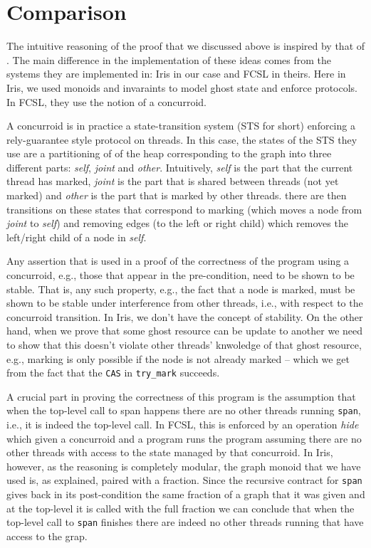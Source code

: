 \documentclass[]{scrartcl}
\def\MyMLe{\lstinline[language=MyML, basicstyle=\small\ttfamily, mathescape=true]}
\begin{document}
\section{Comparison}
The intuitive reasoning of the proof that we discussed above is inspired by that of \cite{Sergey:2015:MVF:2737924.2737964}.
The main difference in the implementation of these ideas comes from the
systems they are implemented in: Iris in our case and FCSL in theirs.
Here in Iris, we used monoids and invaraints to model ghost state and
enforce protocols.
In FCSL, they use the notion of a concurroid.

A concurroid is in practice a state-transition system (STS for short)
enforcing a rely-guarantee style protocol on threads.
In this case, the states of the STS they use are a partitioning of of the
heap corresponding to the graph into three different parts:
\textit{self}, \textit{joint} and \textit{other}.
Intuitively, \textit{self} is the part that the current thread has marked,
\textit{joint} is the part that is shared between threads (not yet marked)
and \textit{other} is the part that is marked by other threads.
there are then transitions on these states that correspond to marking
(which moves a node from \textit{joint} to \textit{self}) and removing
edges (to the left or right child) which removes the left/right child of a
node in \textit{self}.

Any assertion that is used in a proof of the correctness of the program
using a concurroid, e.g., those that appear in the pre-condition,
need to be shown to be stable.
That is, any such property, e.g., the fact that a node is marked, must be
shown to be stable under interference from other threads, i.e., with
respect to the concurroid transition.
In Iris, we don't have the concept of stability.
On the other hand, when we prove that some ghost resource can be
update to another we need to show that this doesn't violate other
threads' knwoledge of that ghost resource, e.g., marking is only possible
if the node is not already marked -- which we get from the fact that the \MyMLe|CAS| in \MyMLe|try_mark| succeeds.

A crucial part in proving the correctness of this program is the
assumption that when the top-level call to span happens there are
no other threads running \MyMLe|span|, i.e., it is indeed the top-level call.
In FCSL, this is enforced by an operation \textit{hide} which given a
concurroid and a program runs the program assuming there are no
other threads with access to the state managed by that concurroid.
In Iris, however, as the reasoning is completely modular, the graph
monoid that we have used is, as explained, paired with a fraction.
Since the recursive contract for \MyMLe|span| gives back in its
post-condition the same fraction of a graph that it was given and at
the top-level it is called with the full fraction we can conclude that
when the top-level call to \MyMLe|span| finishes there are indeed no
other threads running that have access to the grap.
\end{document}
